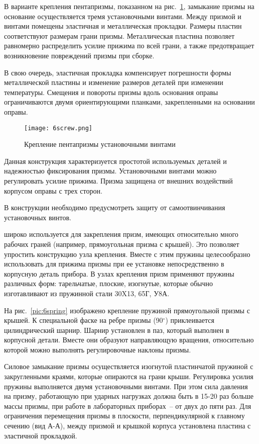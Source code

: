 В варианте крепления пентапризмы, показанном на рис.~\ref{pic:6screw}, замыкание призмы на основание осуществляется тремя установочными винтами. 
Между призмой и винтами помещены эластичная и металлическая прокладки. 
Размеры пластин соответствуют размерам грани призмы. 
Металлическая пластина позволяет равномерно распределить усилие прижима по всей грани, а также предотвращает возникновение повреждений призмы при сборке. 

В свою очередь, эластичная прокладка компенсирует погрешности формы металлической пластины и изменение размеров деталей при изменении температуры. Смещения и повороты призмы вдоль основания оправы ограничиваются двумя ориентирующими планками, закрепленными на основании оправы.

\begin{figure}[h!]
	\texttt{[image: 6screw.png]}
	\caption{ Крепление пентапризмы установочными винтами }
	\label{pic:6screw}
\end{figure}

Данная конструкция характеризуется простотой используемых деталей и надежностью фиксирования призмы. Установочными винтами можно регулировать усилие прижима. Призма защищена от внешних воздействий корпусом оправы с трех сторон.

В конструкции необходимо предусмотреть защиту от самоотвинчивания установочных винтов.

  широко используется для закрепления призм, имеющих относительно много рабочих граней (например, прямоугольная призма с крышей). 
Это позволяет упростить конструкцию узла крепления. 
Вместе с этим пружины целесообразно использовать для прижима призмы при ее установке непосредственно в корпусную деталь прибора. 
В узлах крепления призм применяют пружины различных форм: тарельчатые, плоские, изогнутые, которые обычно изготавливают из пружинной стали 30X13, 65Г, У8А.

На рис.~\ref{pic:6spring} изображено крепление пружиной прямоугольной призмы с крышей. К специальной фаске на ребре призмы (90$ ^\circ $) приклеивается цилиндрический шарнир. Шарнир установлен в паз, который выполнен в корпусной детали. Вместе они образуют направляющую вращения, относительно которой можно выполнять регулировочные наклоны призмы.

Силовое замыкание призмы осуществляется изогнутой пластинчатой пружиной с закругленными краями, которые опираются на грани крыши. Регулировка усилия пружины выполняется двумя установочными винтами. При этом сила давления на призму, работающую при ударных нагрузках должна быть в 15-20 раз больше массы призмы, при работе в лабораторных приборах~-- от двух до пяти раз. Для ограничения перемещения призмы в плоскости, перпендикулярной к главному сечению (вид А-А), между призмой и крышкой корпуса установлена пластина с эластичной прокладкой.

